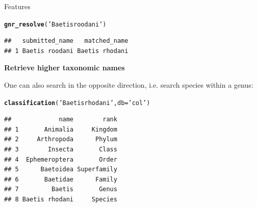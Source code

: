 \documentclass[final,t]{beamer}\usepackage[]{graphicx}\usepackage[]{color}
\makeatletter
\newcommand{\hlstr}[1]{\textcolor[rgb]{0.192,0.494,0.8}{#1}}%
\newcommand{\hlstd}[1]{\textcolor[rgb]{0.345,0.345,0.345}{#1}}%
\newcommand{\hlkwc}[1]{\textcolor[rgb]{0.333,0.667,0.333}{#1}}%
\newcommand{\hlkwd}[1]{\textcolor[rgb]{0.737,0.353,0.396}{\textbf{#1}}}%
\newenvironment{kframe}{%
 \def\at@end@of@kframe{}%
 \ifinner\ifhmode%
  \def\at@end@of@kframe{\end{minipage}}%
  \begin{minipage}{\columnwidth}%
 \fi\fi%
 \def\FrameCommand##1{\hskip\@totalleftmargin \hskip-\fboxsep
 \colorbox{shadecolor}{##1}\hskip-\fboxsep
     \hskip-\linewidth \hskip-\@totalleftmargin \hskip\columnwidth}%
 \MakeFramed {\advance\hsize-\width
   \@totalleftmargin\z@ \linewidth\hsize
   \@setminipage}}%
 {\par\unskip\endMakeFramed%
 \at@end@of@kframe}
\newenvironment{knitrout}{}{} %
\renewenvironment{knitrout}{}{\vspace{-1.8em}}
\makeatother
\begin{document}
\begin{frame}[fragile]
\begin{columns}[t]
\begin{column}{.49\linewidth}
\begin{block}{Features}
\begin{knitrout}\footnotesize
{}\color{fgcolor}\begin{kframe}
\begin{alltt}
\hlkwd{gnr_resolve}\hlstd{(}\hlstr{'Baetis roodani'}\hlstd{)}
\end{alltt}
\end{kframe}
\end{knitrout}
\begin{knitrout}\footnotesize
{}\color{fgcolor}\begin{kframe}
\begin{verbatim}
##   submitted_name   matched_name
## 1 Baetis roodani Baetis rhodani
\end{verbatim}
\end{kframe}
\end{knitrout}
\vspace{2em}
					
\textcolor{i6bluedark}{\textbf{\large Retrieve higher taxonomic names}} 
        \vspace{0.5em}
        \par
        \begingroup
        \leftskip=2cm
        \noindent 
          One can also search in the opposite direction, i.e. search species within a genus:
        \par
        \endgroup

\begin{knitrout}\footnotesize
{}\color{fgcolor}\begin{kframe}
\begin{alltt}
\hlkwd{classification}\hlstd{(}\hlstr{'Baetis rhodani'}\hlstd{,} \hlkwc{db} \hlstd{=} \hlstr{'col'}\hlstd{)}
\end{alltt}
\end{kframe}
\end{knitrout}
\begin{knitrout}\footnotesize
{}\color{fgcolor}\begin{kframe}
\begin{verbatim}
##             name        rank
## 1       Animalia     Kingdom
## 2     Arthropoda      Phylum
## 3        Insecta       Class
## 4  Ephemeroptera       Order
## 5      Baetoidea Superfamily
## 6       Baetidae      Family
## 7         Baetis       Genus
## 8 Baetis rhodani     Species
\end{verbatim}
\end{kframe}
\end{knitrout}
\vspace{2em}



\end{block}
\end{column}
\end{columns}
\end{frame}
\end{document}
